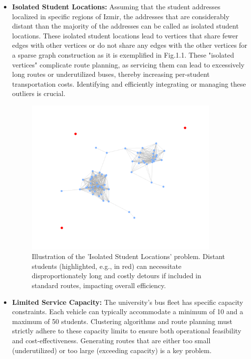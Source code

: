 \begin{itemize}
    \item \textbf{Isolated Student Locations:} Assuming that the student addresses localized in specific regions of Izmir,  the addresses that are considerably distant than the majority of the addresses can be called as isolated student locations. These isolated student locations lead to vertices that share fewer edges with other vertices or do not share any edges with the other vertices for a sparse graph construction as it is exemplified in Fig.1.1. These "isolated vertices" complicate route planning, as servicing them can lead to excessively long routes or underutilized buses, thereby increasing per-student transportation costs. Identifying and efficiently integrating or managing these outliers is crucial.
    \begin{figure}[!htbp]
        \centering
        \includegraphics[width=0.9\textwidth]{img/robustness_problem.png}
        \caption{Illustration of the 'Isolated Student Locations' problem. Distant students (highlighted, e.g., in red) can necessitate disproportionately long and costly detours if included in standard routes, impacting overall efficiency.}
        \label{fig:problem_isolated_students}
    \end{figure}

    \item \textbf{Limited Service Capacity:} The university's bus fleet has specific capacity constraints. Each vehicle can typically accommodate a minimum of 10 and a maximum of 50 students. Clustering algorithms and route planning must strictly adhere to these capacity limits to ensure both operational feasibility and cost-effectiveness. Generating routes that are either too small (underutilized) or too large (exceeding capacity) is a key problem.


\end{itemize}
